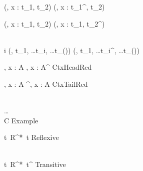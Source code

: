
\Rule{\BinderReductionOne}
    {
    }
    {(\kappa, x : t_1, t_2) \betared {}(\kappa, x : t_1^\prime, t_2) }
    {}

\Rule{\BinderReductionTwo}
    {
    }
    {(\kappa, x : t_1, t_2) \betared {}(\kappa, x : t_1, t_2^\prime) }
    {}

\Rule{\NonbinderReduction}
    {
         \\
        i 
    }
    {(\kappa, t_1, \ldots t_i, \ldots t_{(\kappa)}) \betared {}(\kappa, t_1, \ldots t_i^\prime, \ldots t_{(\kappa)}) }
    {}

\Rule{\ContextReductionHeadRule}
    {
    }
    {\Gamma, x : A \betared \Gamma, x : A^\prime}
    {CtxHeadRed}

\Rule{\ContextReductionTailRule}
    {
    }
    {\Gamma, x : A \betared \Gamma^\prime, x : A}
    {CtxTailRed}

\Rule{\ExampleRule}
    {
        \\ \ldots
        \\ 
    }
    {C}
    {Example}

\Rule{\MultiRefl}
    {\color{white}{\_}}
    {t\ R^*\ t}
    {Reflexive}

\Rule{\MultiStep}
    {
         \\
    }
    {t\ R^*\ t^{\prime\prime}}
    {Transitive}
